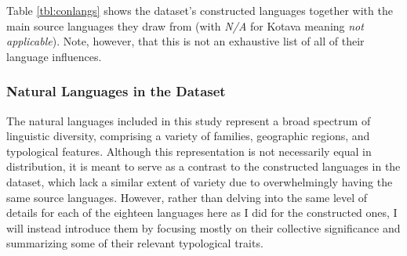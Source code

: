 \documentclass[12pt,a4paper]{article}
\numberwithin{figure}{section}
\numberwithin{table}{section}
\numberwithin{definition}{section}
\begin{document}
Table \ref{tbl:conlangs} shows the dataset's constructed languages together with the main source languages they draw from (with \textit{N/A} for Kotava meaning \textit{not applicable}). Note, however, that this is not an exhaustive list of all of their language influences.




\subsubsection{Natural Languages in the Dataset}
\label{ssec:naturallanguagesinthedataset}

The natural languages included in this study represent a broad spectrum of linguistic diversity, comprising a variety of families, geographic regions, and typological features. Although this representation is not necessarily equal in distribution, it is meant to serve as a contrast to the constructed languages in the dataset, which lack a similar extent of variety due to overwhelmingly having the same source languages. However, rather than delving into the same level of details for each of the eighteen languages here as I did for the constructed ones, I will instead introduce them by focusing mostly on their collective significance and summarizing some of their relevant typological traits.

\end{document}
